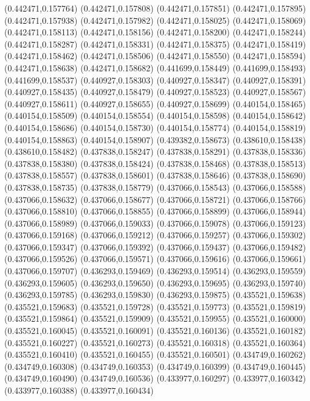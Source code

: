 (0.442471,0.157764)
(0.442471,0.157808)
(0.442471,0.157851)
(0.442471,0.157895)
(0.442471,0.157938)
(0.442471,0.157982)
(0.442471,0.158025)
(0.442471,0.158069)
(0.442471,0.158113)
(0.442471,0.158156)
(0.442471,0.158200)
(0.442471,0.158244)
(0.442471,0.158287)
(0.442471,0.158331)
(0.442471,0.158375)
(0.442471,0.158419)
(0.442471,0.158462)
(0.442471,0.158506)
(0.442471,0.158550)
(0.442471,0.158594)
(0.442471,0.158638)
(0.442471,0.158682)
(0.441699,0.158449)
(0.441699,0.158493)
(0.441699,0.158537)
(0.440927,0.158303)
(0.440927,0.158347)
(0.440927,0.158391)
(0.440927,0.158435)
(0.440927,0.158479)
(0.440927,0.158523)
(0.440927,0.158567)
(0.440927,0.158611)
(0.440927,0.158655)
(0.440927,0.158699)
(0.440154,0.158465)
(0.440154,0.158509)
(0.440154,0.158554)
(0.440154,0.158598)
(0.440154,0.158642)
(0.440154,0.158686)
(0.440154,0.158730)
(0.440154,0.158774)
(0.440154,0.158819)
(0.440154,0.158863)
(0.440154,0.158907)
(0.439382,0.158673)
(0.438610,0.158438)
(0.438610,0.158482)
(0.437838,0.158247)
(0.437838,0.158291)
(0.437838,0.158336)
(0.437838,0.158380)
(0.437838,0.158424)
(0.437838,0.158468)
(0.437838,0.158513)
(0.437838,0.158557)
(0.437838,0.158601)
(0.437838,0.158646)
(0.437838,0.158690)
(0.437838,0.158735)
(0.437838,0.158779)
(0.437066,0.158543)
(0.437066,0.158588)
(0.437066,0.158632)
(0.437066,0.158677)
(0.437066,0.158721)
(0.437066,0.158766)
(0.437066,0.158810)
(0.437066,0.158855)
(0.437066,0.158899)
(0.437066,0.158944)
(0.437066,0.158989)
(0.437066,0.159033)
(0.437066,0.159078)
(0.437066,0.159123)
(0.437066,0.159168)
(0.437066,0.159212)
(0.437066,0.159257)
(0.437066,0.159302)
(0.437066,0.159347)
(0.437066,0.159392)
(0.437066,0.159437)
(0.437066,0.159482)
(0.437066,0.159526)
(0.437066,0.159571)
(0.437066,0.159616)
(0.437066,0.159661)
(0.437066,0.159707)
(0.436293,0.159469)
(0.436293,0.159514)
(0.436293,0.159559)
(0.436293,0.159605)
(0.436293,0.159650)
(0.436293,0.159695)
(0.436293,0.159740)
(0.436293,0.159785)
(0.436293,0.159830)
(0.436293,0.159875)
(0.435521,0.159638)
(0.435521,0.159683)
(0.435521,0.159728)
(0.435521,0.159773)
(0.435521,0.159819)
(0.435521,0.159864)
(0.435521,0.159909)
(0.435521,0.159955)
(0.435521,0.160000)
(0.435521,0.160045)
(0.435521,0.160091)
(0.435521,0.160136)
(0.435521,0.160182)
(0.435521,0.160227)
(0.435521,0.160273)
(0.435521,0.160318)
(0.435521,0.160364)
(0.435521,0.160410)
(0.435521,0.160455)
(0.435521,0.160501)
(0.434749,0.160262)
(0.434749,0.160308)
(0.434749,0.160353)
(0.434749,0.160399)
(0.434749,0.160445)
(0.434749,0.160490)
(0.434749,0.160536)
(0.433977,0.160297)
(0.433977,0.160342)
(0.433977,0.160388)
(0.433977,0.160434)
